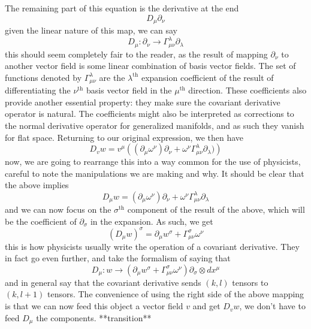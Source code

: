  The remaining part of this equation is the derivative at the end 
 \begin{equation*}
 	D_\mu \partial_\nu
 \end{equation*}
 given the linear nature of this map, we can say 
 \begin{equation*}
 	D_\mu: \partial_\nu \to \Gamma^\lambda_{\mu\nu} \partial_\lambda 
 \end{equation*} 
 this should seem completely fair to the reader, as the result of mapping $\partial_\nu$ to another vector field is some linear combination of basis vector fields.  The set of functions denoted by $\Gamma_{\mu\nu}^\lambda$ are the $\lambda^{\text{th}}$ expansion coefficient of the result of differentiating the $\nu^{\text{th}}$ basis vector field in the $\mu^{\text{th}}$ direction.  These coefficients also provide another essential property: they make sure the covariant derivative operator is natural.  The coefficients might also be interpreted as corrections to the normal derivative operator for generalized manifolds, and as such they vanish for flat space.  Returning to our original expression, we then have 
 \begin{equation*}
 	D_v w = v^\mu\left(( \partial_\mu \omega^\nu)\partial_\nu+\omega^\nu \Gamma^\lambda_{\mu\nu} \partial_\lambda )\right)
 \end{equation*}  
 now, we are going to rearrange this into a way common for the use of physicists, careful to note the manipulations we are making and why.  It should be clear that the above implies
 \begin{equation*}
 	D_\mu w = ( \partial_\mu \omega^\nu)\partial_\nu+\omega^\nu \Gamma^\lambda_{\mu\nu} \partial_\lambda
 \end{equation*}
 and we can now focus on the $\sigma^{\text{th}}$ component of the result of the above, which will be the coefficient of $\partial_\sigma$ in the expansion.  As such, we get 
 \begin{equation*}
 	\left(D_\mu w \right)^\sigma = \partial_\mu w^\sigma +\Gamma^\sigma_{\mu\nu} \omega^\nu
 \end{equation*}
 this is how physicists usually write the operation of a covariant derivative.  They in fact go even further, and take the formalism of saying that 
 \begin{equation*}
 	D_\mu: w \to \left(\partial_\mu w^\sigma +\Gamma^\sigma_{\mu\nu} \omega^\nu\right)\partial_\sigma \otimes dx^\mu
 \end{equation*}
 and in general say that the covariant derivative sends $(k, l)$ tensors to $(k, l+1)$ tensors.  The convenience of using the right side of the above mapping is that we can now feed this object a vector field $v$ and get $D_v w$, we don't have to feed $D_\mu$ the components. **transition**\\
 
